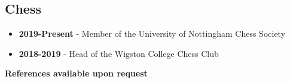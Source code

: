 \documentclass{article}
\begin{document}
\subsection{Chess}
\begin{itemize}[noitemsep]

\item \textbf{2019-Present} - Member of the University of Nottingham Chess Society
\item \textbf{2018-2019} - Head of the Wigston College Chess Club

\end{itemize}










%
%
%
%


\begin{center}

\vskip 0.5cm
\textbf{References available upon request}

\end{center}
\end{document}
